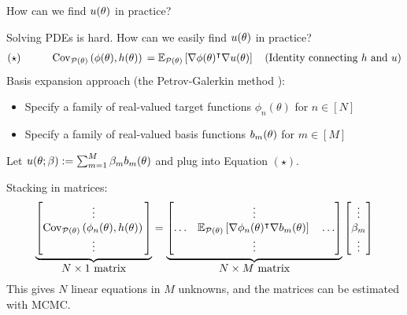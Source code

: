 
\begin{frame}[t]{How can we find $u(\theta)$ in practice?}

Solving PDEs is hard.  How can we easily find $u(\theta)$ in practice?
$$
\begin{aligned}
(\star) \quad\quad\quad 
\mathrm{Cov}_{\mathcal{P}(\theta)}\left( \phi(\theta), h(\theta)\right)\,
={}&
  \mathbb{E}_{\mathcal{P}(\theta)}\left[ \nabla \phi(\theta)^\intercal 
                      \nabla u(\theta) \right]\,
  & \textrm{(Identity connecting $h$ and $u$)}
\end{aligned}
$$
Basis expansion approach (the  Petrov-Galerkin method 
\parencite{ern_theory_2004,nusken:2024:SteinTransportBayesian2024,maurais:2024:SamplingUnitTime2024}):
%
\begin{itemize}
\item Specify a family of real-valued target functions $\phi_n(\theta)$ for $n \in [N]$
\item Specify a family of real-valued basis functions $b_m(\theta)$ for $m \in [M]$
\end{itemize}
%
Let $u(\theta; \beta) := \sum_{m=1}^M \beta_m b_m(\theta)$ and
plug into Equation $(\star)$.

\pause
%
Stacking in matrices:
$$
\begin{aligned}
\underbrace{
\begin{bmatrix}
  \vdots\\
  \cov{\p(\theta)}{\phi_n(\theta), \h(\theta)} \\
  \vdots\\
\end{bmatrix}%
}_{
  \shortstack{$N \times 1$ matrix}
}
=
%
%
\underbrace{
\begin{bmatrix}
  & \vdots & \\
\hdots &
\expect{\p(\theta)}{\nabla \phi_n(\theta)^\trans 
                      \nabla \b_m(\theta) } &
\hdots \\
  & \vdots & \\
\end{bmatrix}%
}_{
  \shortstack{$N \times M$ matrix}
}
\begin{bmatrix}
  \vdots \\
  \beta_m \\
  \vdots
\end{bmatrix}%
\end{aligned}
$$
%
This gives $N$ linear equations in $M$ unknowns, and the matrices
can be estimated with MCMC.\\[1em]


\end{frame}




